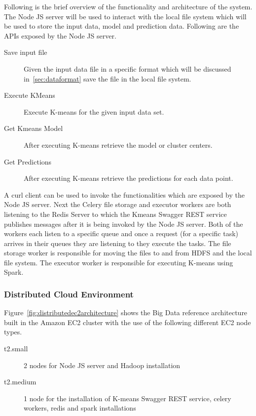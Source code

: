 Following is the brief overview of the functionality and architecture 
of the system. The Node JS server will be used to interact with the local file 
system which will be used to store the input data, model and prediction data. 
Following are the APIs exposed by the Node JS server.

\begin{description}
	\item[Save input file] Given the input data file in a specific format which 
	will be discussed in~\ref{sec:dataformat} save the file in the local file 
	system.
	\item[Execute KMeans] Execute K-means for the given input data set.
	\item[Get Kmeans Model] After executing K-means retrieve the model or 
	cluster centers.
	\item[Get Predictions] After executing K-means retrieve the predictions for 
	each data point.
\end{description}

A curl client can be used to invoke the functionalities which are exposed by 
the Node JS server. Next the Celery file storage and executor workers are both 
listening to the Redis Server to which the Kmeans Swagger REST service 
publishes messages after it is being invoked by the Node JS server. Both of 
the workers each listen to a specific queue and once a request (for a specific 
task) arrives in their queues they are listening to they execute the tasks. 
The file storage worker is responsible for moving the files to and from HDFS 
and the local file system. The executor worker is responsible for executing 
K-means using Spark.

\subsubsection{Distributed Cloud Environment}
\label{subsubsec:distributedcloud}

Figure~\ref{fig:distributedec2architecture} shows the Big Data reference 
architecture built in the Amazon EC2 cluster with the use of the following 
different EC2 node types.

\begin{description}
	\item[t2.small] 2 nodes for Node JS server and Hadoop installation
	\item[t2.medium] 1 node for the installation of K-means Swagger REST 
	service, celery workers, redis and spark installations
\end{description}

